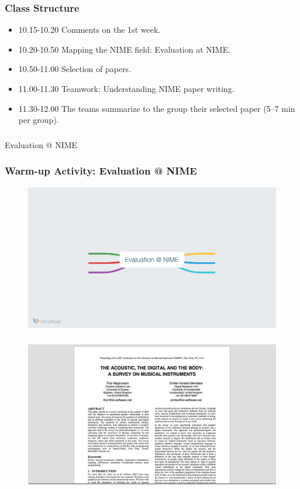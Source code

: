 \documentclass[screen, aspectratio=169]{beamer}
\begin{document}
%
\begin{frame}
\frametitle{Class Structure}
\begin{itemize}
\item 10.15-10.20 Comments on the 1st week.
\item 10.20-10.50 Mapping the NIME field: Evaluation at NIME.
\item 10.50-11.00 Selection of papers.
\item 11.00-11.30 Teamwork: Understanding NIME paper writing.
\item 11.30-12.00 The teams summarize to the group their selected paper (5--7 min per group). 
\end{itemize}
\end{frame}
%
\begin{frame}
\frametitle{}
\Huge{Evaluation @ NIME}
\end{frame}
%
\begin{frame}
\frametitle{Warm-up Activity: Evaluation @ NIME}
 \begin{figure}
	\includegraphics[scale=0.35]{img/mindmap-eval-nime.png}
    \end{figure}	
\end{frame}
%
\begin{frame}
\frametitle{}
\begin{figure}
	\includegraphics[scale=0.31]{img/Magnusson-Mendieta-2007.png}\\
	    \cite{Magnusson.Mendieta.2007.NIME}\\
    \end{figure}		
\end{frame}
\end{document}
